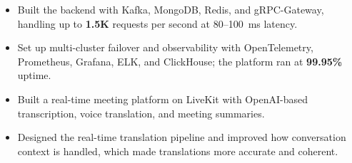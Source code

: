 
\projDattingQ
\begin{itemize}
    \item Built the backend with Kafka, MongoDB, Redis, and gRPC-Gateway, handling up to \textbf{1.5K} requests per second at 80--100~ms latency. %
    \item Set up multi-cluster failover and observability with OpenTelemetry, Prometheus, Grafana, ELK, and ClickHouse; the platform ran at \textbf{99.95\%} uptime. %
\end{itemize}

\projMeetQ
\begin{itemize}
    \item Built a real-time meeting platform on LiveKit with OpenAI-based transcription, voice translation, and meeting summaries. %
    \item Designed the real-time translation pipeline and improved how conversation context is handled, which made translations more accurate and coherent. %
\end{itemize}

\cveducation


